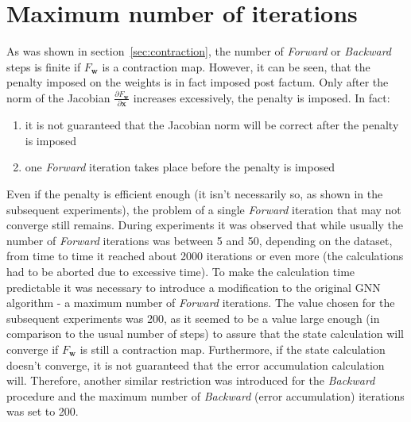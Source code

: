 \section{Maximum number of iterations}
As was shown in section~\ref{sec:contraction}, the number of \emph{Forward} or \emph{Backward} steps is finite if $F_{\bm{w}}$ is a contraction map. However, it can be seen, that the penalty imposed on the weights is in fact imposed post factum. Only after the norm of the Jacobian $\frac{\partial F_{\bm{w}}}{\partial \bm{x}}$ increases excessively, the penalty is imposed. In fact:
\begin{enumerate}
	\item it is not guaranteed that the Jacobian norm will be correct after the penalty is imposed
	\item one \emph{Forward} iteration takes place before the penalty is imposed
\end{enumerate}
Even if the penalty is efficient enough (it isn't necessarily so, as shown in the subsequent experiments), the problem of a single \emph{Forward} iteration that may not converge still remains. During experiments it was observed that while usually the number of \emph{Forward} iterations was between 5 and 50, depending on the dataset, from time to time it reached about 2000 iterations or even more (the calculations had to be aborted due to excessive time). To make the calculation time predictable it was necessary to introduce a modification to the original GNN algorithm - a maximum number of \emph{Forward} iterations. The value chosen for the subsequent experiments was 200, as it seemed to be a value large enough (in comparison to the usual number of steps) to assure that the state calculation will converge if $F_{\bm{w}}$ is still a contraction map. Furthermore, if the state calculation doesn't converge, it is not guaranteed that the error accumulation calculation will. Therefore, another similar restriction was introduced for the \emph{Backward} procedure and the maximum number of \emph{Backward} (error accumulation) iterations was set to 200. 

\newpage
